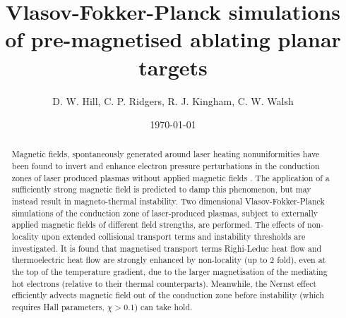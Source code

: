 \documentclass[aip,reprint]{revtex4-1}
\begin{document}

\title{Vlasov-Fokker-Planck simulations of pre-magnetised ablating planar targets} %



\author{D. W. Hill, C. P. Ridgers, R. J. Kingham, C. W. Walsh}



\date{\today}

\begin{abstract}
	Magnetic fields, spontaneously generated around  laser heating nonuniformities have been found to invert and enhance electron pressure perturbations in the conduction zones of laser produced plasmas without applied magnetic fields \cite{Hill2018}. The application of a sufficiently strong magnetic field is predicted to damp this phenomenon, but may instead result in magneto-thermal instability. Two dimensional Vlasov-Fokker-Planck simulations of the conduction zone of laser-produced plasmas, subject to externally applied magnetic fields  of different field strengths, are performed. The effects of non-locality upon extended collisional transport terms and instability thresholds are investigated. It is found that magnetised transport terms Righi-Leduc heat flow and thermoelectric heat flow are strongly enhanced by non-locality (up to 2 fold), even at the top of the temperature gradient, due to the larger magnetisation of the mediating hot electrons (relative to their thermal counterparts). Meanwhile, the Nernst effect efficiently advects magnetic field out of the conduction zone before instability (which requires Hall parameters, $\chi >0.1$) can take hold. 
\end{abstract}
% 
\end{document}
